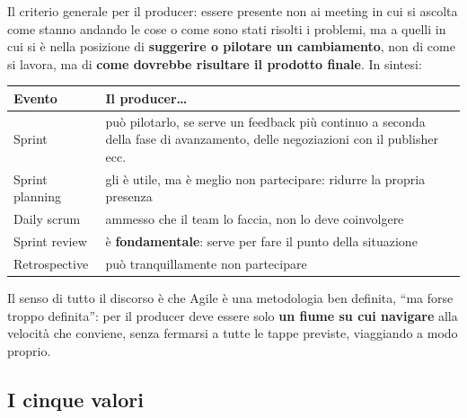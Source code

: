 Il criterio generale per il producer: essere presente non ai meeting in cui si
ascolta come stanno andando le cose o come sono stati risolti i problemi, ma a
quelli in cui si è nella posizione di \textbf{suggerire o pilotare un
cambiamento}, non di come si lavora, ma di \textbf{come dovrebbe risultare il
prodotto finale}. In sintesi:
\begin{center}
  \begin{tabular}{@{}lp{}@{}}
    \toprule
    \textbf{Evento} & \textbf{Il producer\dots} \\
    \midrule
    Sprint & può pilotarlo, se serve un feedback più continuo a seconda della
    fase di avanzamento, delle negoziazioni con il publisher ecc. \\
    Sprint planning & gli è utile, ma è meglio non partecipare: ridurre la
    propria presenza \\
    Daily scrum & ammesso che il team lo faccia, non lo deve coinvolgere \\
    Sprint review & è \textbf{fondamentale}: serve per fare il punto della
    situazione \\
    Retrospective & può tranquillamente non partecipare \\
    \bottomrule
  \end{tabular}
\end{center}
Il senso di tutto il discorso è che Agile è una metodologia ben definita, ``ma
forse troppo definita'': per il producer deve essere solo \textbf{un fiume su cui
navigare} alla velocità che conviene, senza fermarsi a tutte le tappe previste,
viaggiando a modo proprio.

\subsection{I cinque valori}
\label{sec:z5-scrum-valori}

